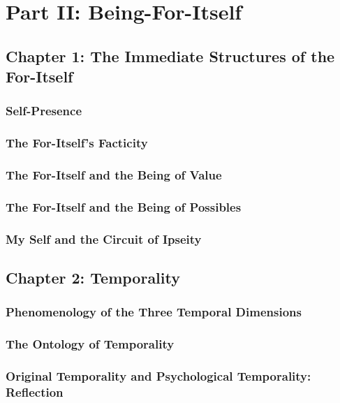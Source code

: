\section{Part II: Being-For-Itself}

\subsection{Chapter 1: The Immediate Structures of the For-Itself}

\subsubsection{Self-Presence}

\subsubsection{The For-Itself's Facticity}

\subsubsection{The For-Itself and the Being of Value}

\subsubsection{The For-Itself and the Being of Possibles}

\subsubsection{My Self and the Circuit of Ipseity}

\subsection{Chapter 2: Temporality}

\subsubsection{Phenomenology of the Three Temporal Dimensions}

\subsubsection{The Ontology of Temporality}

\subsubsection{Original Temporality and Psychological Temporality: Reflection}

